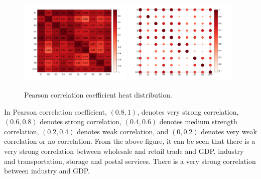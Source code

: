 \documentclass[12pt]{article}  %
\begin{document}
	\begin{figure}[H]
		\centering
    		\includegraphics[width=0.48\textwidth]{img/q1_Growth_Rate_Correlation_Matrix20}
			\includegraphics[width=0.48\textwidth]{img/q1_Scatter_Heatmap20} 
		\caption{Pearson correlation coefficient heat distribution.}
		\label{figure4}
	\end{figure}

	In Pearson correlation coefficient, ${(0.8, 1)}$, denotes very strong correlation, ${(0.6, 0.8)}$ denotes strong correlation, ${(0.4, 0.6)}$ denotes medium strength correlation, ${(0.2, 0.4)}$ denotes weak correlation, and ${(0, 0.2)}$ denotes  very weak correlation or no correlation. From the above figure, it can be seen that there is a very strong correlation between wholesale and retail trade and GDP, industry and transportation, storage and postal services. There is a very strong correlation between industry and GDP.
	
	
	
	

\end{document}
